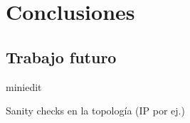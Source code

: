 \chapter{Conclusiones}

\graphicspath{{Chapter5/Figs/}}

\section{Trabajo futuro}
miniedit

Sanity checks en la topología (IP por ej.)